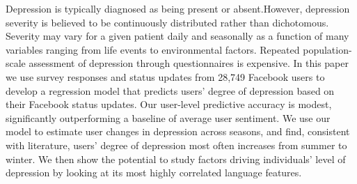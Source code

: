 Depression is typically diagnosed as being present or absent.However, depression severity is believed to be continuously distributed rather than dichotomous. Severity may vary for a given patient daily and seasonally as a function of many variables ranging from life events to environmental factors. Repeated population-scale assessment of depression through questionnaires is expensive. In this paper we use survey responses and status updates from 28,749 Facebook users to develop a regression model that predicts users' degree of depression based on their Facebook status updates. Our user-level predictive accuracy is modest, significantly outperforming a baseline of average user sentiment. We use our model to estimate user changes in depression across seasons, and find, consistent with literature, users' degree of depression most often increases from summer to winter. We then show the potential to study factors driving individuals' level of depression by looking at its most highly correlated language features.
